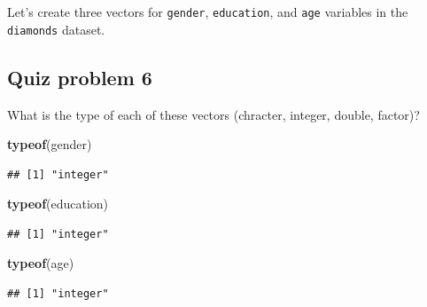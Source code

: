 \documentclass[]{book}
\newenvironment{Shaded}{\begin{snugshade}}{\end{snugshade}}
\newcommand{\KeywordTok}[1]{\textcolor[rgb]{0.13,0.29,0.53}{\textbf{#1}}}
\newcommand{\NormalTok}[1]{#1}
\newcommand{\OperatorTok}[1]{\textcolor[rgb]{0.81,0.36,0.00}{\textbf{#1}}}
\newcommand{\StringTok}[1]{\textcolor[rgb]{0.31,0.60,0.02}{#1}}
\begin{document}
Let's create three vectors for \texttt{gender}, \texttt{education}, and \texttt{age} variables in the \texttt{diamonds} dataset.

\begin{Shaded}
\end{Shaded}

\hypertarget{quiz-problem-6}{%
\subsection{Quiz problem 6}\label{quiz-problem-6}}

What is the type of each of these vectors (chracter, integer, double, factor)?

\begin{Shaded}
\begin{Highlighting}[]
\KeywordTok{typeof}\NormalTok{(gender)}
\end{Highlighting}
\end{Shaded}

\begin{verbatim}
## [1] "integer"
\end{verbatim}

\begin{Shaded}
\begin{Highlighting}[]
\KeywordTok{typeof}\NormalTok{(education)}
\end{Highlighting}
\end{Shaded}

\begin{verbatim}
## [1] "integer"
\end{verbatim}

\begin{Shaded}
\begin{Highlighting}[]
\KeywordTok{typeof}\NormalTok{(age)}
\end{Highlighting}
\end{Shaded}

\begin{verbatim}
## [1] "integer"
\end{verbatim}
\end{document}
